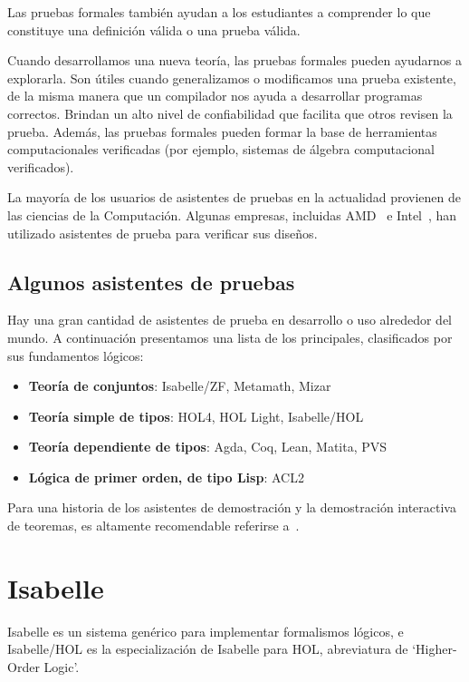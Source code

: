 \documentclass[12pt]{book}
\begin{document}
Las pruebas formales también ayudan a los estudiantes a comprender lo que constituye una definición válida o una prueba válida.

Cuando desarrollamos una nueva teoría, las pruebas formales pueden ayudarnos a explorarla. Son útiles cuando generalizamos o modificamos una prueba existente, de la misma manera que un compilador nos ayuda a desarrollar programas correctos. Brindan un alto nivel de confiabilidad que facilita que otros revisen la prueba.
Además, las pruebas formales pueden formar la base de herramientas computacionales verificadas (por ejemplo,
sistemas de álgebra computacional verificados).

La mayoría de los usuarios de asistentes de pruebas en la actualidad provienen de las ciencias de la Computación. Algunas empresas, incluidas AMD~\cite{Hitchhiker_amd} e Intel~\cite{Hitchhiker_intel}, han utilizado asistentes de prueba para verificar sus diseños.

\subsection{Algunos asistentes de pruebas}
Hay una gran cantidad de asistentes de prueba en desarrollo o uso alrededor del mundo. A continuación presentamos una lista de los principales, clasificados por sus fundamentos lógicos:

\begin{itemize}
	\item \textbf{Teoría de conjuntos}: Isabelle/ZF, Metamath, Mizar
	\item \textbf{Teoría simple de tipos}: HOL4, HOL Light, Isabelle/HOL
	\item \textbf{Teoría dependiente de tipos}: Agda, Coq, Lean, Matita, PVS
	\item \textbf{Lógica de primer orden, de tipo Lisp}: ACL2
\end{itemize}

Para una historia de los asistentes de demostración y la demostración interactiva de teoremas, es altamente recomendable referirse a~\cite{history_of_Interactive_Theorem_Proving}.



\section{Isabelle}

Isabelle es un sistema genérico para implementar formalismos lógicos, e Isabelle/HOL es la especialización de Isabelle para HOL, abreviatura de `Higher-Order Logic'.
\end{document}

